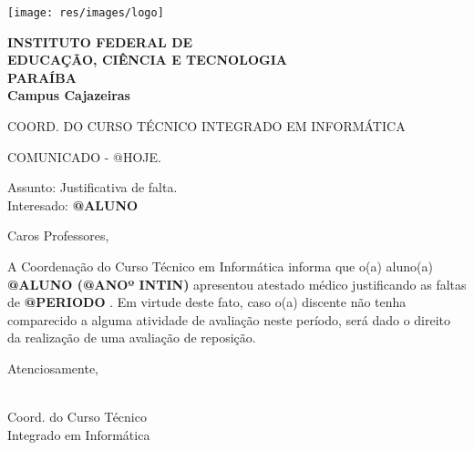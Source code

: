 \documentclass[a5paper, 12pt]{letter}
\begin{document}
\hspace{.2cm}
\begin{minipage}{.19\textwidth}
    \texttt{[image: res/images/logo]}
\end{minipage}
\begin{minipage}[t]{\textwidth}
        \vspace{.001cm}
        {\bf
            {\selectfont
                INSTITUTO FEDERAL DE\\
                EDUCAÇÃO, CIÊNCIA E TECNOLOGIA\\
                {\color{green}
                    PARAÍBA\\
                    Campus Cajazeiras
                }
            }
        }
\end{minipage}
{\bf
{\selectfont
    \begin{center}
        {\selectfont
            COORD. DO CURSO TÉCNICO INTEGRADO EM INFORMÁTICA
        }
    \end{center}
}
}

\noindent COMUNICADO - @HOJE.

\noindent Assunto: Justificativa de falta.\\
Interesado: {\bf @ALUNO }

\noindent Caros Professores,

\onehalfspacing A Coordenação do Curso Técnico em Informática informa que o(a) aluno(a) {\bf @ALUNO (@ANOº INTIN) } apresentou atestado médico justificando as faltas de {\bf @PERIODO }. Em virtude deste fato, caso o(a) discente não tenha comparecido a alguma atividade de avaliação neste período, será dado o direito da realização de uma avaliação de reposição.

\noindent Atenciosamente,

\begin{flushright}
\\
\indent Coord. do Curso Técnico\\
\indent Integrado em Informática\\
\end{flushright}
\end{document}
